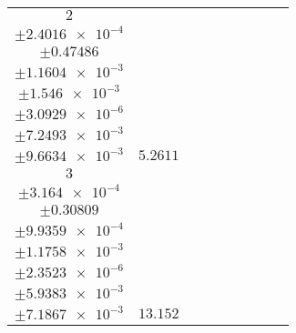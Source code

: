\documentclass[8pt]{article}
\begin{document}
\begin{longtable}[l]{c c c c c c c c c}
$\num{2}$ & \begin{tabular}[c]{@{}c@{}}$\num{2.9149e-2}$ \\ $\pm\num{2.4016e-4}$\end{tabular} & \begin{tabular}[c]{@{}c@{}}$\num{-0.29962}$ \\ $\pm\num{0.47486}$\end{tabular} & \begin{tabular}[c]{@{}c@{}}$\num{-6.9245}$ \\ $\pm\num{1.1604e-3}$\end{tabular} & \begin{tabular}[c]{@{}c@{}}$\num{3.5406e+3}$ \\ $\pm\num{1.546e-3}$\end{tabular} & \begin{tabular}[c]{@{}c@{}}$\num{7.0831}$ \\ $\pm\num{3.0929e-6}$\end{tabular} & \begin{tabular}[c]{@{}c@{}}$\num{0.69142}$ \\ $\pm\num{7.2493e-3}$\end{tabular} & \begin{tabular}[c]{@{}c@{}}$\num{0.63901}$ \\ $\pm\num{9.6634e-3}$\end{tabular} & $\num{5.2611}$\\
$\num{3}$ & \begin{tabular}[c]{@{}c@{}}$\num{6.2078e-2}$ \\ $\pm\num{3.164e-4}$\end{tabular} & \begin{tabular}[c]{@{}c@{}}$\num{2.6459}$ \\ $\pm\num{0.30809}$\end{tabular} & \begin{tabular}[c]{@{}c@{}}$\num{-0.5152}$ \\ $\pm\num{9.9359e-4}$\end{tabular} & \begin{tabular}[c]{@{}c@{}}$\num{3.547e+3}$ \\ $\pm\num{1.1758e-3}$\end{tabular} & \begin{tabular}[c]{@{}c@{}}$\num{7.0959}$ \\ $\pm\num{2.3523e-6}$\end{tabular} & \begin{tabular}[c]{@{}c@{}}$\num{1.0187}$ \\ $\pm\num{5.9383e-3}$\end{tabular} & \begin{tabular}[c]{@{}c@{}}$\num{0.97416}$ \\ $\pm\num{7.1867e-3}$\end{tabular} & $\num{13.152}$\\

\end{longtable}
\end{document}
